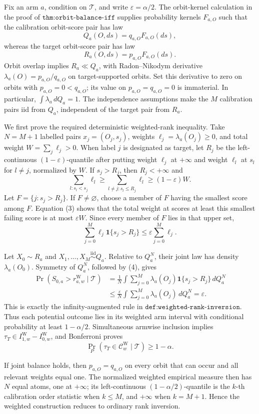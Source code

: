 Fix an arm \(a\), condition on \(\mathcal T\), and write \(\varepsilon=\alpha/2\). The orbit-kernel calculation in the proof of \(\texttt{thm:orbit-balance-iff}\) supplies probability kernels \(F_{a,O}\) such that the calibration orbit-score pair has law \[Q_a(O,ds)=q_{a,O}F_{a,O}(ds),\] whereas the target orbit-score pair has law \[R_a(O,ds)=p_{a,O}F_{a,O}(ds).\] Orbit overlap implies \(R_a\ll Q_a\), with Radon--Nikodym derivative \(\lambda_a(O)=p_{a,O}/q_{a,O}\) on target-supported orbits. Set this derivative to zero on orbits with \(p_{a,O}=0<q_{a,O}\); its value on \(p_{a,O}=q_{a,O}=0\) is immaterial. In particular, \(\int\lambda_a\,dQ_a=1\). The independence assumptions make the \(M\) calibration pairs iid from \(Q_a\), independent of the target pair from \(R_a\).

We first prove the required deterministic weighted-rank inequality. Take \(N=M+1\) labelled pairs \(x_j=(O_j,s_j)\), weights \(\ell_j=\lambda_a(O_j)\ge0\), and total weight \(W=\sum_j\ell_j>0\). When label \(j\) is designated as target, let \(R_j\) be the left-continuous \((1-\varepsilon)\)-quantile after putting weight \(\ell_j\) at \(+\infty\) and weight \(\ell_l\) at \(s_l\) for \(l\ne j\), normalized by \(W\). If \(s_j>R_j\), then \(R_j<+\infty\) and \[\sum_{l:s_l<s_j}\ell_l\ge\sum_{l\ne j:s_l\le R_j}\ell_l\ge(1-\varepsilon)W.\tag{3}\] Let \(F=\{j:s_j>R_j\}\). If \(F\ne\varnothing\), choose a member of \(F\) having the smallest score among \(F\). Equation (3) shows that the total weight at scores at least this smallest failing score is at most \(\varepsilon W\). Since every member of \(F\) lies in that upper set, \[\sum_{j=0}^M\ell_j\mathbf 1\{s_j>R_j\}\le\varepsilon\sum_{j=0}^M\ell_j.\tag{4}\]

Let \(X_0\sim R_a\) and \(X_1,\ldots,X_M\overset{\mathrm{iid}}{\sim}Q_a\). Relative to \(Q_a^N\), their joint law has density \(\lambda_a(O_0)\). Symmetry of \(Q_a^N\), followed by (4), gives \[\begin{aligned}\Pr(S_{0,a}>r^{\mathrm W}_{a,w}\mid\mathcal T)&=\frac1N\int\sum_{j=0}^M\lambda_a(O_j)\mathbf 1\{s_j>R_j\}\,dQ_a^N\\&\le\frac{\varepsilon}{N}\int\sum_{j=0}^M\lambda_a(O_j)\,dQ_a^N=\varepsilon.\end{aligned}\] This is exactly the infinity-augmented rule in \(\texttt{def:weighted-rank-inversion}\). Thus each potential outcome lies in its weighted arm interval with conditional probability at least \(1-\alpha/2\). Simultaneous armwise inclusion implies \(\tau_T\in I^{\mathrm W}_{1,w}-I^{\mathrm W}_{0,w}\), and Bonferroni proves \[\Pr_P(\tau_T\in\mathcal C^{\mathrm W}_w\mid\mathcal T)\ge1-\alpha.\]

If joint balance holds, then \(p_{a,O}=q_{a,O}\) on every orbit that can occur and all relevant weights equal one. The normalized weighted empirical measure then has \(N\) equal atoms, one at \(+\infty\); its left-continuous \((1-\alpha/2)\)-quantile is the \(k\)-th calibration order statistic when \(k\le M\), and \(+\infty\) when \(k=M+1\). Hence the weighted construction reduces to ordinary rank inversion.
